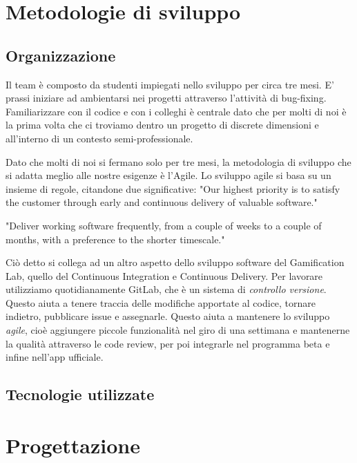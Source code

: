 \documentclass[Lau, oneside]{sapthesis}%
\begin{document}
\chapter{Metodologie di sviluppo}
\label{ch:2}
\section{Organizzazione}
\label{sec:team}
Il team è composto da studenti impiegati nello sviluppo per circa tre mesi. E' prassi iniziare ad ambientarsi nei progetti attraverso
l'attività di bug-fixing. Familiarizzare con il codice e con i colleghi è centrale dato che per molti di noi è la prima volta che 
ci troviamo dentro un progetto di discrete dimensioni e all'interno di un contesto semi-professionale.

Dato che molti di noi si fermano solo per tre mesi, la metodologia di sviluppo che si adatta meglio alle nostre esigenze è l'Agile.
Lo sviluppo agile si basa su un insieme di regole, citandone due significative:
"Our highest priority is to satisfy the customer
through early and continuous delivery of valuable software."

"Deliver working software frequently, from a
couple of weeks to a couple of months, with a
preference to the shorter timescale."

Ciò detto si collega ad un altro aspetto dello sviluppo software del Gamification Lab, quello del Continuous Integration e Continuous
Delivery. Per lavorare utilizziamo quotidianamente GitLab, che è un sistema di \textit{controllo versione}. Questo aiuta a tenere
traccia delle modifiche apportate al codice, tornare indietro, pubblicare issue e assegnarle. Questo aiuta a mantenere lo sviluppo
\textit{agile}, cioè aggiungere piccole funzionalità nel giro di una settimana e mantenerne la qualità attraverso le code review, per
poi integrarle nel programma beta e infine nell'app ufficiale.



\section{Tecnologie utilizzate}
\label{sec:tech}


\chapter{Progettazione}
\label{ch:3}
\end{document}
